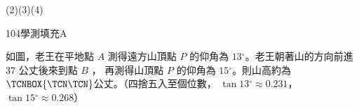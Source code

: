\begin{QUESTIONS}
\begin{QUESTION}
        \begin{QANS}
            (2)(3)(4)
        \end{QANS}
        \begin{QSOLLIST}
            \begin{QSOL}
			\end{QSOL}
        \end{QSOLLIST}
        \begin{QEMPTYSPACE}
        \end{QEMPTYSPACE}
    \end{QUESTION}
\end{QUESTIONS}
\begin{QUESTIONS}
    \begin{QUESTION}
        \begin{ExamInfo}{104}{學測}{填充}{A}
        \end{ExamInfo}
        \begin{ExamAnsRateInfo}{43}{81}{44}{4}
        \end{ExamAnsRateInfo}
        \begin{QBODY}
            如圖，老王在平地點 $A$ 測得遠方山頂點 $P$  的仰角為 $13{}^\circ $。老王朝著山的方向前進 $37$ 公丈後來到點 $B$ ， 再測得山頂點 $P$ 的仰角為 $15{}^\circ $。則山高約為$\TCNBOX{\TCN\TCN}$公丈。（四捨五入至個位數， $\tan 13{}^\circ \approx 0.231$， $\tan 15{}^\circ \approx 0.268$）
			

\end{QBODY}
\end{QUESTION}
\end{QUESTIONS}
